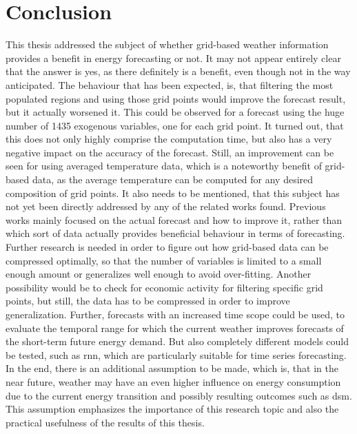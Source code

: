 \chapter{Conclusion}
\label{ch:Conclusion}

This thesis addressed the subject of whether grid-based weather information provides a benefit in energy forecasting or not. It may not appear entirely clear that the answer is yes, as there definitely is a benefit, even though not in the way anticipated. The behaviour that has been expected, is, that filtering the most populated regions and using those grid points would improve the forecast result, but it actually worsened it. This could be observed for a forecast using the huge number of 1435 exogenous variables, one for each grid point. It turned out, that this does not only highly comprise the computation time, but also has a very negative impact on the accuracy of the forecast. Still, an improvement can be seen for using \eg averaged temperature data, which is a noteworthy benefit of grid-based data, as the average temperature can be computed for any desired composition of grid points. It also needs to be mentioned, that this subject has not yet been directly addressed by any of the related works found. Previous works mainly focused on the actual forecast and how to improve it, rather than which sort of data actually provides beneficial behaviour in terms of forecasting. Further research is needed in order to figure out how grid-based data can be compressed optimally, so that the number of variables is limited to a small enough amount or generalizes well enough to avoid over-fitting. Another possibility would be to check for economic activity for filtering specific grid points, but still, the data has to be compressed in order to improve generalization. Further, forecasts with an increased time scope could be used, to evaluate the temporal range for which the current weather improves forecasts of the short-term future energy demand. But also completely different models could be tested, such as \gls{rnn}, which are particularly suitable for time series forecasting. In the end, there is an additional assumption to be made, which is, that in the near future, weather may have an even higher influence on energy consumption due to the current energy transition and possibly resulting outcomes such as \gls{dsm}. This assumption emphasizes the importance of this research topic and also the practical usefulness of the results of this thesis.\\

